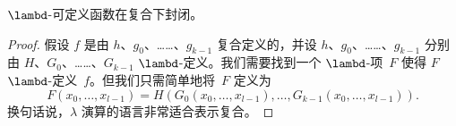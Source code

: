 \documentclass[../../../include/open-logic-section]{subfiles}
\begin{document}

\begin{lem}
$\lambd$-可定义函数在复合下封闭。
\end{lem}

\begin{proof}
假设 $f$ 是由 $h$、$g_0$、……、$g_{k-1}$ 复合定义的，并设 $h$、$g_0$、……、$g_{k-1}$ 分别由 $H$、$G_0$、……、$G_{k-1}$ $\lambd$-定义。我们需要找到一个 $\lambd$-项~$F$ 使得 $F$ $\lambd$-定义~$f$。但我们只需简单地将~$F$ 定义为
\[
F(x_0, \dots, x_{l-1}) = H(G_0(x_0, \dots, x_{l-1}),
\dots, G_{k-1}(x_0, \dots, x_{l-1})).
\]
换句话说，$\lambda$ 演算的语言非常适合表示复合。
\end{proof}
\end{document}
